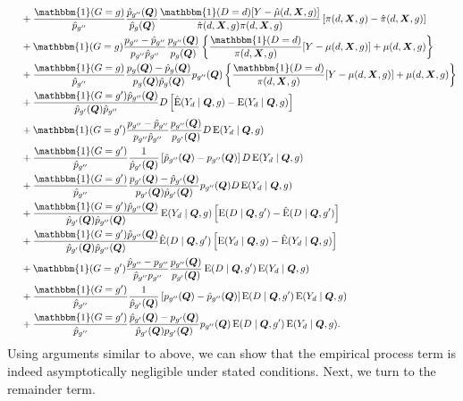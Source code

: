 \documentclass[12pt,a4paper]{article}
\newcommand{\E}{\operatorname{E}}
\def\X{{\boldsymbol X}}
\def\Q{{\boldsymbol Q}}
\def\one{\mathbbm{1}}
\begin{document}
\begin{align*}
    &\phantom{{}={}} + \frac{\one(G=g)}{\hat{p}_{g''}}\frac{\hat{p}_{g''}(\Q)}{\hat{p}_{g}(\Q)} \frac{\one(D=d)[Y-\hat{\mu}(d,\X,g)]}{\hat{\pi}(d,\X,g)\pi(d,\X,g)}\left[\pi(d,\X,g)-\hat{\pi}(d,\X,g)\right] \\
    &\phantom{{}={}} + \one(G=g)\frac{p_{g''}-\hat{p}_{g''}}{p_{g''}\hat{p}_{g''}} \frac{p_{g''}(\Q)}{p_g(\Q)} \left\{ \frac{\one(D=d)}{\pi(d,\X,g)} [Y-\mu(d,\X,g)] + \mu(d,\X,g) \right\} \\
    &\phantom{{}={}} + \frac{\one(G=g)}{\hat{p}_{g''}} \frac{p_g(\Q)-\hat{p}_g(\Q)}{p_g(\Q)\hat{p}_g(\Q)}p_{g''}(\Q) \left\{ \frac{\one(D=d)}{\pi(d,\X,g)} [Y-\mu(d,\X,g)] + \mu(d,\X,g) \right\} \\
    &\phantom{{}={}} + \frac{\one(G=g')\hat{p}_{g''}(\Q)}{\hat{p}_{g'}(\Q)\hat{p}_{g''}} D \left[ \hat{\E}(Y_d \mid \Q,g)-\E(Y_d \mid \Q,g) \right] \\
    &\phantom{{}={}} + \one(G=g')\frac{p_{g''}-\hat{p}_{g''}}{p_{g''}\hat{p}_{g''}} \frac{p_{g''}(\Q)}{p_{g'}(\Q)}D\E(Y_d \mid \Q,g) \\
    &\phantom{{}={}} + \frac{\one(G=g')}{\hat{p}_{g''}} \frac{1}{\hat{p}_{g'}(\Q)} \left[ \hat{p}_{g''}(\Q)-p_{g''}(\Q) \right] D \E(Y_d \mid \Q,g) \\
    &\phantom{{}={}} + \frac{\one(G=g')}{\hat{p}_{g''}} \frac{p_{g'}(\Q)-\hat{p}_{g'}(\Q)}{p_{g'}(\Q)\hat{p}_{g'}(\Q)} p_{g''}(\Q) D \E(Y_d \mid \Q,g) \\
    &\phantom{{}={}} + \frac{\one(G=g')\hat{p}_{g''}(\Q)}{\hat{p}_{g'}(\Q) \hat{p}_{g''}(\Q)} \E(Y_d \mid \Q,g) \left[ \E(D \mid \Q,g')-\hat{\E}(D \mid \Q,g') \right] \\
    &\phantom{{}={}} + \frac{\one(G=g')\hat{p}_{g''}(\Q)}{\hat{p}_{g'}(\Q) \hat{p}_{g''}(\Q)} \hat{\E}(D \mid \Q,g')\left[ \E(Y_d \mid \Q,g)-\hat{\E}(Y_d \mid \Q,g) \right] \\
    &\phantom{{}={}} + \one(G=g')\frac{\hat{p}_{g''}-p_{g''}}{\hat{p}_{g''}p_{g''}} \frac{p_{g''}(\Q)}{p_{g'}(\Q)} \E(D \mid \Q,g') \E(Y_d \mid \Q,g) \\
    &\phantom{{}={}} + \frac{\one(G=g')}{\hat{p}_{g''}} \frac{1}{\hat{p}_{g'}(\Q)} \left[ p_{g''}(\Q)-\hat{p}_{g''}(\Q) \right] \E(D \mid \Q,g')\E(Y_d \mid \Q,g) \\
    &\phantom{{}={}} + \frac{\one(G=g')}{\hat{p}_{g''}} \frac{\hat{p}_{g'}(\Q)-p_{g'}(\Q)}{\hat{p}_{g'}(\Q)p_{g'}(\Q)} p_{g''}(\Q) \E(D \mid \Q,g')\E(Y_d \mid \Q,g).
\end{align*}
Using arguments similar to above, we can show that the empirical process term is indeed asymptotically negligible under stated conditions. Next, we turn to the remainder term.
\end{document}

